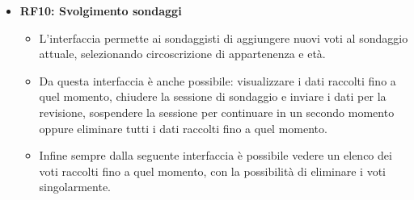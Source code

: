    \begin{itemize}
        \item \textbf{RF10: Svolgimento sondaggi} \begin{itemize}
            \item L'interfaccia permette ai sondaggisti di aggiungere nuovi voti al sondaggio attuale, selezionando circoscrizione di appartenenza e età.
            \item Da questa interfaccia è anche possibile: visualizzare i dati raccolti fino a quel momento, chiudere la sessione di sondaggio e inviare i dati per la revisione, sospendere la sessione per continuare in un secondo momento oppure eliminare tutti i dati raccolti fino a quel momento.
            \item Infine sempre dalla seguente interfaccia è possibile vedere un elenco dei voti raccolti fino a quel momento, con la possibilità di eliminare i voti singolarmente.
        \end{itemize}
    \end{itemize}
    